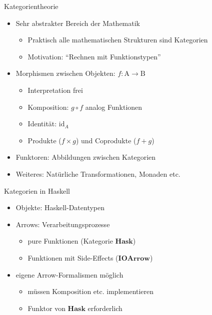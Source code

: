 \documentclass{beamer}
\newcommand\ato{\rightarrow} %
\begin{document}
\begin{frame}{Kategorientheorie}
  \begin{itemize}
  \item Sehr abstrakter Bereich der Mathematik
    \begin{itemize}    
    \item Praktisch alle mathematischen Strukturen sind Kategorien
    \item Motivation: ``Rechnen mit Funktionstypen''
    \end{itemize}
  \item Morphismen zwischen Objekten: $f: \mathrm{A} \ato \mathrm{B}$
    \begin{itemize}
    \item Interpretation frei
    \item Komposition: $g \circ f$ analog Funktionen
    \item Identität: $\mathrm{id}_{A}$
    \item Produkte ($f \times g$) und Coprodukte ($f + g$)
    \end{itemize}
  \item Funktoren: Abbildungen zwischen Kategorien
  \item Weiteres: Natürliche Transformationen, Monaden etc.
  \end{itemize}
\end{frame}

\begin{frame}{Kategorien in Haskell}
  \begin{itemize}
  \item Objekte: Haskell-Datentypen 
  \item Arrows: Verarbeitungsprozesse
    \begin{itemize}
    \item pure Funktionen (Kategorie $\mathbf{Hask}$)
    \item Funktionen mit Side-Effects ($\mathbf{IOArrow}$)
    \end{itemize}
  \item eigene Arrow-Formalismen möglich
    \begin{itemize}
    \item müssen Komposition etc. implementieren
    \item Funktor von $\mathbf{Hask}$ erforderlich
    \end{itemize}
  \end{itemize}
\end{frame}
\end{document}
